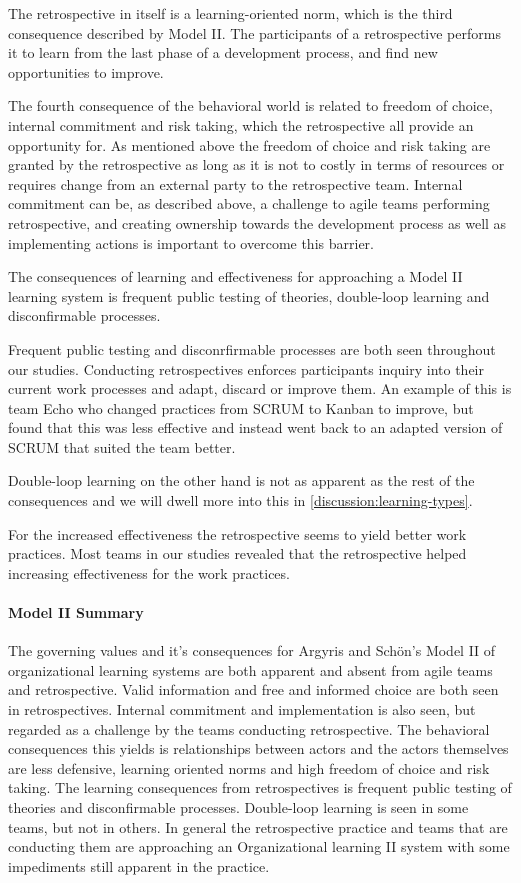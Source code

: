 The retrospective in itself is a learning-oriented norm, which is the third consequence described by Model II. The participants of a retrospective performs it to learn from the last phase of a development process, and find new opportunities to improve. 

The fourth consequence of the behavioral world is related to freedom of choice, internal commitment and risk taking, which the retrospective all provide an opportunity for. As mentioned above the freedom of choice and risk taking are granted by the retrospective as long as it is not to costly in terms of resources or requires change from an external party to the retrospective team. Internal commitment can be, as described above, a challenge to agile teams performing retrospective, and creating ownership towards the development process as well as implementing actions is important to overcome this barrier.  

The consequences of learning and effectiveness for approaching a Model II learning system is frequent public testing of theories, double-loop learning and disconfirmable processes. 

Frequent public testing and disconrfirmable processes are both seen throughout our studies. Conducting retrospectives enforces participants inquiry into their current work processes and adapt, discard or improve them. An example of this is team Echo who changed practices from SCRUM to Kanban to improve, but found that this was less effective and instead went back to an adapted version of SCRUM that suited the team better. 

Double-loop learning on the other hand is not as apparent as the rest of the consequences and we will dwell more into this in \autoref{discussion:learning-types}. 

For the increased effectiveness the retrospective seems to yield better work practices. Most teams in our studies revealed that the retrospective helped increasing effectiveness for the work practices. 

\paragraph{Model II Summary}
The governing values and it's consequences for Argyris and Schön's Model II of organizational learning systems are both apparent and absent from agile teams and retrospective. Valid information and free and informed choice are both seen in retrospectives. Internal commitment and implementation is also seen, but regarded as a challenge by the teams conducting retrospective. The behavioral consequences this yields is relationships between actors and the actors themselves are less defensive, learning oriented norms and high freedom of choice and risk taking. The learning consequences from retrospectives is frequent public testing of theories and disconfirmable processes. Double-loop learning is seen in some teams, but not in others. In general the retrospective practice and teams that are conducting them are approaching an Organizational learning II system with some impediments still apparent in the practice.

